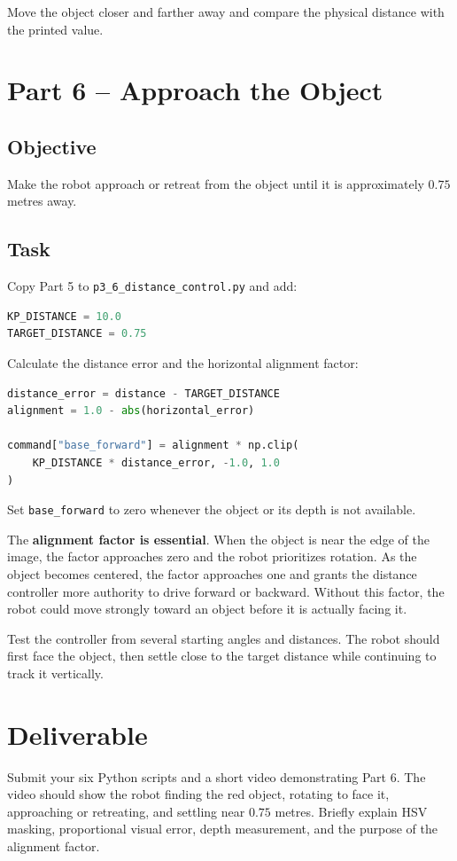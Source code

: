 \documentclass[11pt,a4paper]{article}
\begin{document}
Move the object closer and farther away and compare the physical distance with
the printed value.

\newpage

\section*{Part 6 -- Approach the Object}

\subsection*{Objective}

Make the robot approach or retreat from the object until it is approximately
\(0.75\) metres away.

\subsection*{Task}

Copy Part 5 to \texttt{p3\_6\_distance\_control.py} and add:

\begin{lstlisting}[language=Python]
KP_DISTANCE = 10.0
TARGET_DISTANCE = 0.75
\end{lstlisting}

Calculate the distance error and the horizontal alignment factor:

\begin{lstlisting}[language=Python]
distance_error = distance - TARGET_DISTANCE
alignment = 1.0 - abs(horizontal_error)

command["base_forward"] = alignment * np.clip(
    KP_DISTANCE * distance_error, -1.0, 1.0
)
\end{lstlisting}

Set \texttt{base\_forward} to zero whenever the object or its depth is not
available.

The \textbf{alignment factor is essential}. When the object is near the edge
of the image, the factor approaches zero and the robot prioritizes rotation.
As the object becomes centered, the factor approaches one and grants the
distance controller more authority to drive forward or backward. Without this
factor, the robot could move strongly toward an object before it is actually
facing it.

Test the controller from several starting angles and distances. The robot
should first face the object, then settle close to the target distance while
continuing to track it vertically.

\newpage

\section*{Deliverable}

Submit your six Python scripts and a short video demonstrating Part 6. The
video should show the robot finding the red object, rotating to face it,
approaching or retreating, and settling near \(0.75\) metres. Briefly explain
HSV masking, proportional visual error, depth measurement, and the purpose of
the alignment factor.
\end{document}
